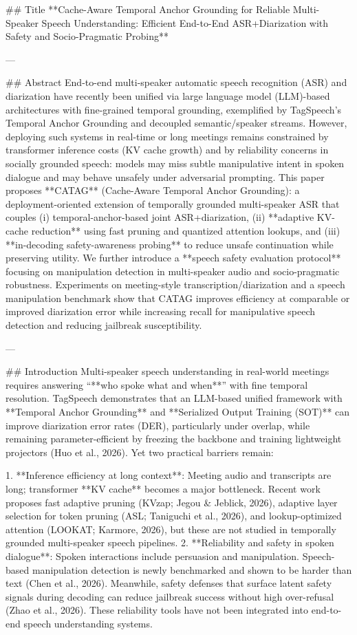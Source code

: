 ## Title  
**Cache-Aware Temporal Anchor Grounding for Reliable Multi-Speaker Speech Understanding: Efficient End-to-End ASR+Diarization with Safety and Socio-Pragmatic Probing**

---

## Abstract  
End-to-end multi-speaker automatic speech recognition (ASR) and diarization have recently been unified via large language model (LLM)-based architectures with fine-grained temporal grounding, exemplified by TagSpeech’s Temporal Anchor Grounding and decoupled semantic/speaker streams. However, deploying such systems in real-time or long meetings remains constrained by transformer inference costs (KV cache growth) and by reliability concerns in socially grounded speech: models may miss subtle manipulative intent in spoken dialogue and may behave unsafely under adversarial prompting. This paper proposes **CATAG** (Cache-Aware Temporal Anchor Grounding): a deployment-oriented extension of temporally grounded multi-speaker ASR that couples (i) temporal-anchor-based joint ASR+diarization, (ii) **adaptive KV-cache reduction** using fast pruning and quantized attention lookups, and (iii) **in-decoding safety-awareness probing** to reduce unsafe continuation while preserving utility. We further introduce a **speech safety evaluation protocol** focusing on manipulation detection in multi-speaker audio and socio-pragmatic robustness. Experiments on meeting-style transcription/diarization and a speech manipulation benchmark show that CATAG improves efficiency at comparable or improved diarization error while increasing recall for manipulative speech detection and reducing jailbreak susceptibility.  

---

## Introduction  
Multi-speaker speech understanding in real-world meetings requires answering “**who spoke what and when**” with fine temporal resolution. TagSpeech demonstrates that an LLM-based unified framework with **Temporal Anchor Grounding** and **Serialized Output Training (SOT)** can improve diarization error rates (DER), particularly under overlap, while remaining parameter-efficient by freezing the backbone and training lightweight projectors (Huo et al., 2026). Yet two practical barriers remain:

1. **Inference efficiency at long context**: Meeting audio and transcripts are long; transformer **KV cache** becomes a major bottleneck. Recent work proposes fast adaptive pruning (KVzap; Jegou & Jeblick, 2026), adaptive layer selection for token pruning (ASL; Taniguchi et al., 2026), and lookup-optimized attention (LOOKAT; Karmore, 2026), but these are not studied in temporally grounded multi-speaker speech pipelines.
2. **Reliability and safety in spoken dialogue**: Spoken interactions include persuasion and manipulation. Speech-based manipulation detection is newly benchmarked and shown to be harder than text (Chen et al., 2026). Meanwhile, safety defenses that surface latent safety signals during decoding can reduce jailbreak success without high over-refusal (Zhao et al., 2026). These reliability tools have not been integrated into end-to-end speech understanding systems.

